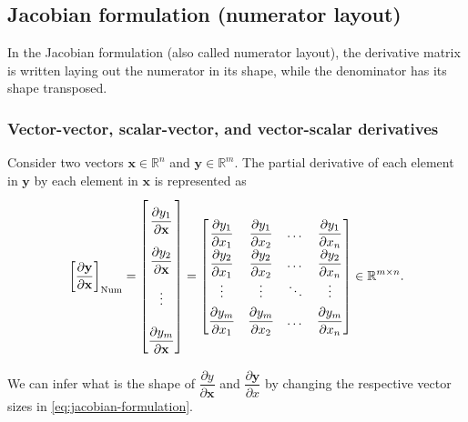 \subsection{Jacobian formulation (numerator layout)}

In the Jacobian formulation (also called numerator layout), the derivative matrix is written laying out the numerator in its shape, while the denominator has its shape transposed.

\subsubsection{Vector-vector, scalar-vector, and vector-scalar derivatives}
Consider two vectors \(\mathbf{x} \in \mathbb{R}^n\) and \(\mathbf{y} \in \mathbb{R}^m\). The partial derivative of each element in \(\mathbf{y}\) by each element in \(\mathbf{x}\) is represented as
\begin{align}
    \label{eq:jacobian-formulation}
    \left[ \dfrac{\partial \mathbf{y}}{\partial \mathbf{x}} \right]_{\textnormal{Num}} = \renewcommand{\arraystretch}{2.6} \begin{bmatrix}
        \dfrac{\partial y_1}{\partial \mathbf{x}} \\
        \dfrac{\partial y_2}{\partial \mathbf{x}} \\ 
        \vdots \\ 
        \dfrac{\partial y_m}{\partial \mathbf{x}}
    \end{bmatrix} = \renewcommand{\arraystretch}{1.8}
    \begin{bmatrix}
        \dfrac{\partial y_1}{\partial x_1} & \dfrac{\partial y_1}{\partial x_2} & \dots & \dfrac{\partial y_1}{\partial x_n} \\
        \dfrac{\partial y_2}{\partial x_1} & \dfrac{\partial y_2}{\partial x_2} & \dots & \dfrac{\partial y_2}{\partial x_n} \\
        \vdots & \vdots & \ddots & \vdots \\
        \dfrac{\partial y_m}{\partial x_1} & \dfrac{\partial y_m}{\partial x_2} & \dots & \dfrac{\partial y_m}{\partial x_n} \\
    \end{bmatrix} \in \mathbb{R}^{m\times n}.
\end{align}

We can infer what is the shape of \(\dfrac{\partial y}{\partial \mathbf{x}}\) and \(\dfrac{\partial \mathbf{y}}{\partial x}\) by changing the respective vector sizes in \eqref{eq:jacobian-formulation}.


